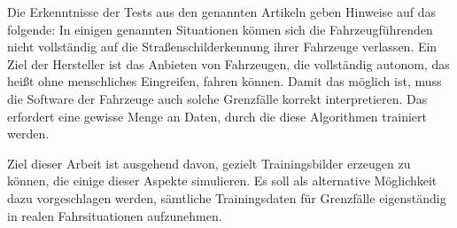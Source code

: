 Die Erkenntnisse der Tests aus den genannten Artikeln geben Hinweise auf das folgende: In einigen genannten Situationen können sich die Fahrzeugführenden nicht vollständig auf die Straßenschilderkennung ihrer Fahrzeuge verlassen. Ein Ziel der Hersteller ist das Anbieten von Fahrzeugen, die vollständig autonom, das heißt ohne menschliches Eingreifen, fahren können. Damit das möglich ist, muss die Software der Fahrzeuge auch solche Grenzfälle korrekt interpretieren. Das erfordert eine gewisse Menge an Daten, durch die diese Algorithmen trainiert werden.

Ziel dieser Arbeit ist ausgehend davon, gezielt Trainingsbilder erzeugen zu können, die einige dieser Aspekte simulieren. Es soll als alternative Möglichkeit dazu vorgeschlagen werden, sämtliche Trainingsdaten für Grenzfälle eigenständig in realen Fahrsituationen aufzunehmen.


